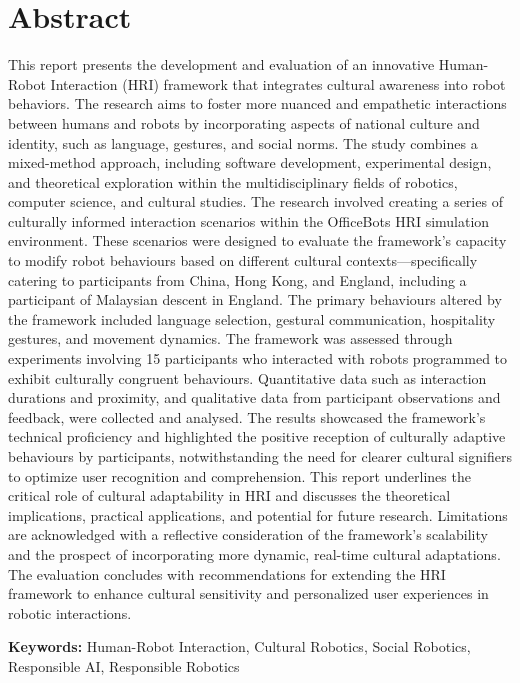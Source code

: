 
\chapter*{Abstract}


This report presents the development and evaluation of an innovative Human-Robot Interaction (HRI) framework that integrates cultural awareness into robot behaviors. The research aims to foster more nuanced and empathetic interactions between humans and robots by incorporating aspects of national culture and identity, such as language, gestures, and social norms. The study combines a mixed-method approach, including software development, experimental design, and theoretical exploration within the multidisciplinary fields of robotics, computer science, and cultural studies.
The research involved creating a series of culturally informed interaction scenarios within the OfficeBots HRI simulation environment. These scenarios were designed to evaluate the framework's capacity to modify robot behaviours based on different cultural contexts—specifically catering to participants from China, Hong Kong, and England, including a participant of Malaysian descent in England. The primary behaviours altered by the framework included language selection, gestural communication, hospitality gestures, and movement dynamics.
The framework was assessed through experiments involving 15 participants who interacted with robots programmed to exhibit culturally congruent behaviours. Quantitative data such as interaction durations and proximity, and qualitative data from participant observations and feedback, were collected and analysed. The results showcased the framework's technical proficiency and highlighted the positive reception of culturally adaptive behaviours by participants, notwithstanding the need for clearer cultural signifiers to optimize user recognition and comprehension.
This report underlines the critical role of cultural adaptability in HRI and discusses the theoretical implications, practical applications, and potential for future research. Limitations are acknowledged with a reflective consideration of the framework's scalability and the prospect of incorporating more dynamic, real-time cultural adaptations. The evaluation concludes with recommendations for extending the HRI framework to enhance cultural sensitivity and personalized user experiences in robotic interactions.

\textbf{Keywords:} Human-Robot Interaction, Cultural Robotics, Social Robotics, Responsible AI, Responsible Robotics